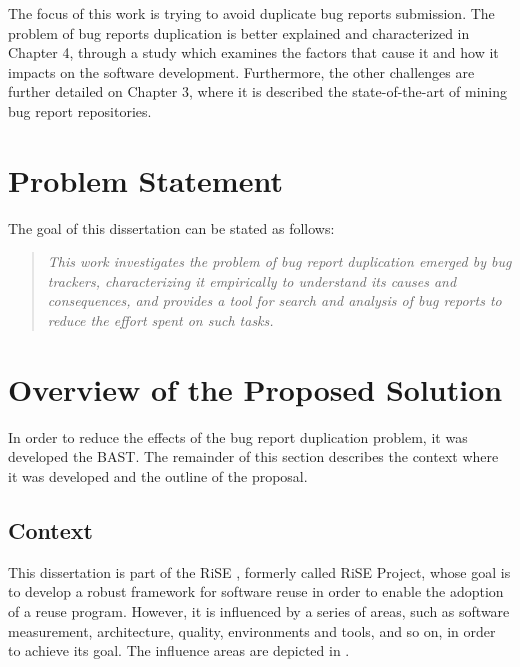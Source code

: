 The focus of this work is trying to avoid duplicate bug reports submission. The
problem of bug reports duplication is better explained and characterized in
Chapter 4, through a study which examines the factors that cause
it and how it impacts on the software development. Furthermore, the other
challenges are further detailed on Chapter 3, where it is
described the state-of-the-art of mining bug report repositories.

\section{Problem Statement}
\label{sc:problem}
The goal of this dissertation can be stated as follows:

\begin{quote}
\emph{This work investigates the problem of bug report duplication emerged
by bug trackers, characterizing it empirically to understand its causes and
consequences, and provides a tool for search and analysis of bug reports to
reduce the effort spent on such tasks.}
\end{quote}

\section{Overview of the Proposed Solution}
\label{sc:solution}
In order to reduce the effects of the bug report duplication problem, it was
developed the \acf{BAST}. The remainder of this section describes the context
where it was developed and the outline of the proposal.

\subsection{Context}
This dissertation is part of the \ac{RiSE} \citep{Almeida2004}, formerly
called RiSE Project, whose goal is to develop a robust framework for software
reuse in order to enable the adoption of a reuse program. However, it is
influenced by a series of areas, such as software measurement, architecture,
quality, environments and tools, and so on, in order to achieve its goal. The
influence areas are depicted in .

